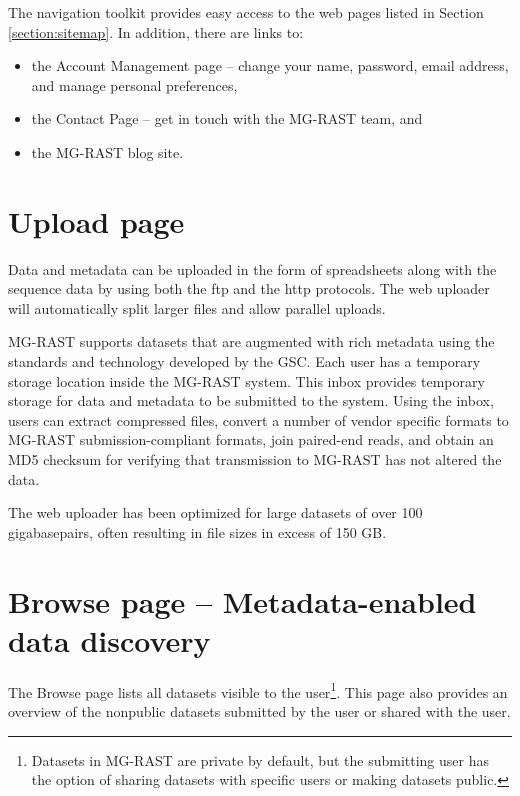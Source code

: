 \documentclass[12pt,fullpage]{report}
\begin{document}
The navigation toolkit provides easy access to the web pages listed in Section \ref{section:sitemap}. In addition, there are links to:
\begin{itemize}
\item the Account Management page -- change your name, password, email address, and manage personal preferences,

\item the Contact Page -- get in touch with the MG-RAST team, and

\item the MG-RAST blog site.
\end{itemize}
\section{Upload page}

Data and metadata can be uploaded in the form of spreadsheets along with the sequence data by using both the ftp and the http protocols. The web uploader will automatically split larger files and allow parallel uploads.

MG-RAST supports datasets that are augmented with rich metadata using the standards and technology developed by the GSC.
Each user has a temporary storage location inside the MG-RAST system. This inbox provides temporary storage for data and metadata to be submitted to the system. Using the inbox, users can extract compressed files, convert a number of vendor specific formats to MG-RAST submission-compliant formats, join paired-end reads, and obtain an \gls{MD5} checksum for verifying that transmission to MG-RAST has not altered the data.

The web uploader has been optimized for large datasets of over 100 gigabasepairs, often resulting in file sizes in excess of 150 GB.
\section{Browse page -- Metadata-enabled data discovery}

The Browse page lists all datasets visible to the user\footnote{Datasets in MG-RAST are private by default, but the submitting user has the option of sharing datasets with specific users or  making datasets public.}. This page also provides an overview of the nonpublic datasets submitted by the user or shared with the user.
\end{document}
